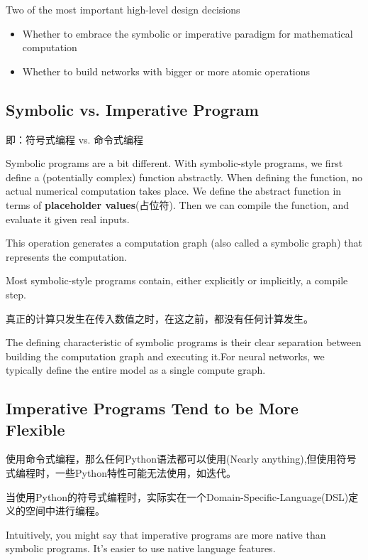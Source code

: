 Two of the most important high-level design decisions

\begin{itemize}
\item Whether to embrace the symbolic or imperative paradigm for mathematical computation

\item Whether to build networks with bigger or more atomic operations
\end{itemize}

\subsection{Symbolic vs. Imperative Program}

即：符号式编程 vs. 命令式编程

Symbolic programs are a bit different. With symbolic-style programs, we first define a (potentially complex) function abstractly. When defining the function, no actual numerical computation takes place. We define the abstract function in terms of \textbf{placeholder values}(占位符). Then we can compile the function, and evaluate it given real inputs. 

This operation generates a computation graph (also called a symbolic graph) that represents the computation.

Most symbolic-style programs contain, either explicitly or implicitly, a compile step. 

真正的计算只发生在传入数值之时，在这之前，都没有任何计算发生。

The defining characteristic of symbolic programs is their clear separation between building the computation graph and executing it.For neural networks, we typically define the entire model as a single compute graph.

\subsection{Imperative Programs Tend to be More Flexible}

使用命令式编程，那么任何Python语法都可以使用(Nearly anything),但使用符号式编程时，一些Python特性可能无法使用，如迭代。

当使用Python的符号式编程时，实际实在一个Domain-Specific-Language(DSL)定义的空间中进行编程。

Intuitively, you might say that imperative programs are more native than symbolic programs. It’s easier to use native language features. 

